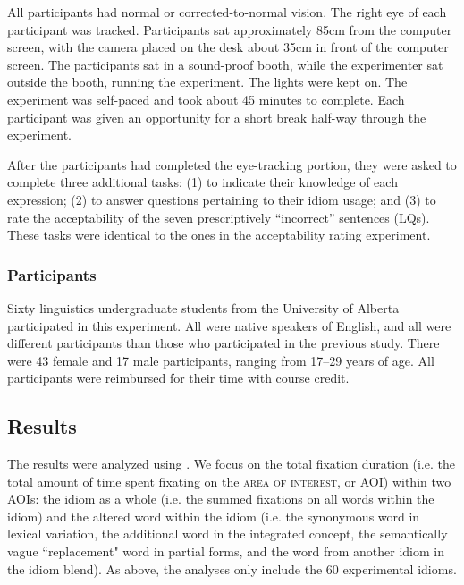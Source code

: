 \documentclass[output=paper,modfonts,nonflat]{langsci/langscibook}
\begin{document}
All participants had normal or corrected-to-normal vision. The right eye of each participant was tracked. Participants sat approximately 85cm from the computer screen, with the camera placed on the desk about 35cm in front of the computer screen. The participants sat in a sound-proof booth, while the experimenter sat outside the booth, running the experiment. The lights were kept on. The experiment was self-paced and took about 45 minutes to complete. Each participant was given an opportunity for a short break half-way through the experiment.

After the participants had completed the eye-tracking portion, they were asked to complete three additional tasks: (1) to indicate their knowledge of each expression; (2) to answer questions pertaining to their idiom usage; and (3) to rate the acceptability of the seven prescriptively ``incorrect'' sentences (LQs). These tasks were identical to the ones in the acceptability rating experiment.



\subsubsection{Participants}

Sixty linguistics undergraduate students from the University of Alberta participated in this experiment. All were native speakers of English, and all were different participants than those who participated in the previous study. There were 43 female and 17 male participants, ranging from 17--29 years of age. All participants were reimbursed for their time with course credit.



\subsection{Results}

The results were analyzed using . We focus on the total fixation duration (i.e. the total amount of time spent fixating on the \textsc{area of interest}, or AOI) within two AOIs: the idiom as a whole (i.e. the summed fixations on all words within the idiom) and the altered word within the idiom (i.e. the synonymous word in lexical variation, the additional word in the integrated concept, the semantically vague ``replacement" word in partial forms, and the word from another idiom in the idiom blend). As above, the analyses only include the 60 experimental idioms. %
\end{document}
